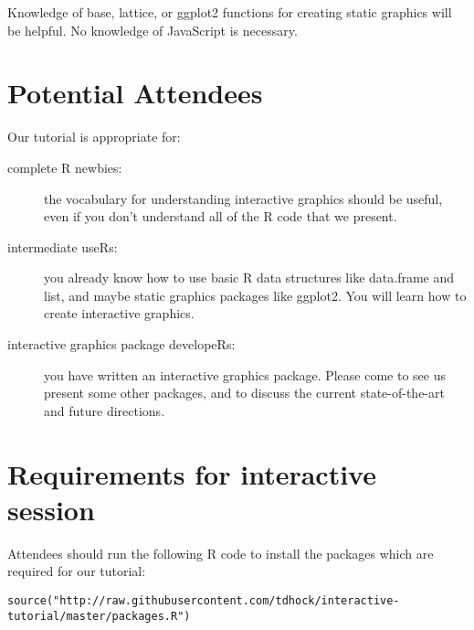\documentclass[11pt]{article}
\begin{document}
Knowledge of base, lattice, or ggplot2
functions for creating static graphics will be helpful. No
knowledge of JavaScript is necessary.

\section*{Potential Attendees}
\label{sec:orgheadline12}
Our tutorial is appropriate for:
\begin{description}
\item[complete R newbies:] the vocabulary for understanding interactive
graphics should be useful, even if you don't understand all of the R
code that we present.
\item[intermediate useRs:] you already know how to use basic R data
  structures like data.frame and list, and maybe static graphics
  packages like ggplot2. You will learn how to create interactive
  graphics.
\item[interactive graphics package developeRs:] you have written an
  interactive graphics package. Please come to see us present some
  other packages, and to discuss the current state-of-the-art and
  future directions.
\end{description}

\section*{Requirements for interactive session}

Attendees should run the following R code to install the packages
which are required for our tutorial:

\begin{verbatim}
source("http://raw.githubusercontent.com/tdhock/interactive-tutorial/master/packages.R")
\end{verbatim}
\end{document}
